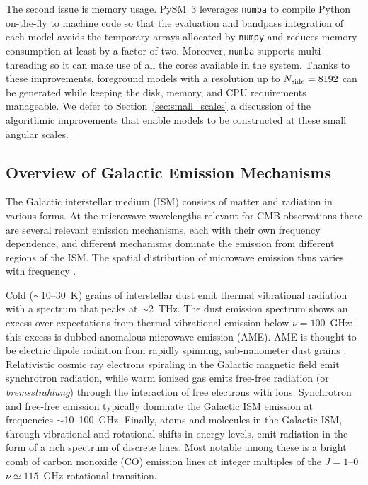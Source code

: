 \documentclass[twocolumn]{aastex631}
\begin{document}
The second issue is memory usage. PySM~3 leverages \texttt{numba} \citep{Lam:2015} to compile Python on-the-fly to machine code so that the evaluation and bandpass integration of each model avoids the temporary arrays allocated by \texttt{numpy} and reduces memory consumption at least by a factor of two. Moreover, \texttt{numba} supports multi-threading so it can make use of all the cores available in the system. Thanks to these improvements, foreground models with a resolution up to $N_{\rm side}=8192$ can be generated while keeping the disk, memory, and CPU requirements manageable. We defer to Section~\ref{sec:small_scales} a discussion of the algorithmic improvements that enable models to be constructed at these small angular scales.

\subsection{Overview of Galactic Emission Mechanisms} \label{sec:emission_mechanisms}
The Galactic interstellar medium (ISM) consists of matter and radiation in various forms. At the microwave wavelengths relevant for CMB observations there are several relevant emission mechanisms, each with their own frequency dependence, and different mechanisms dominate the emission from different regions of the ISM. The spatial distribution of microwave emission thus varies with frequency \citep[e.g.,][]{planck2014-a12}.

Cold ($\sim$10--30~K) grains of interstellar dust emit thermal vibrational radiation with a spectrum that peaks at $\sim$2~THz. The dust emission spectrum shows an excess over expectations from thermal vibrational emission below $\nu=100$~GHz: this excess is dubbed anomalous microwave emission (AME). AME is thought to be electric dipole radiation from rapidly spinning, sub-nanometer dust grains \citep{Draine:1998b}. Relativistic cosmic ray electrons spiraling in the Galactic magnetic field emit synchrotron radiation, while warm ionized gas emits free-free radiation (or \emph{bremsstrahlung}) through the interaction of free electrons with ions. Synchrotron and free-free emission typically dominate the Galactic ISM emission at frequencies $\sim$10--100~GHz. Finally, atoms and molecules in the Galactic ISM, through vibrational and rotational shifts in energy levels, emit radiation in the form of a rich spectrum of discrete lines. Most notable among these is a bright comb of carbon monoxide (CO) emission lines at integer multiples of the $J=1$--$0$ $\nu \simeq 115$~GHz rotational transition.
\end{document}

